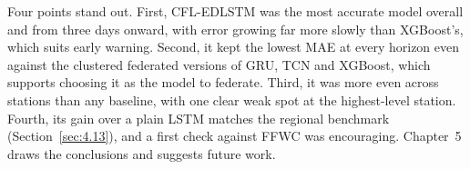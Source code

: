 Four points stand out. First, CFL-EDLSTM was the most accurate model overall and
from three days onward, with error growing far more slowly than XGBoost's, which
suits early warning. Second, it kept the lowest MAE at every horizon even against
the clustered federated versions of GRU, TCN and XGBoost, which supports choosing
it as the model to federate. Third, it was more even across stations than any
baseline, with one clear weak spot at the highest-level station. Fourth, its gain
over a plain LSTM matches the regional benchmark (Section~\ref{sec:4.13}), and a
first check against FFWC was encouraging. Chapter~5 draws the conclusions and
suggests future work.